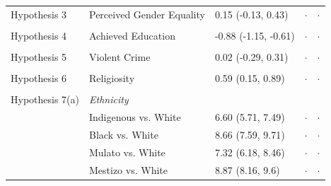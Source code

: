 \documentclass[12pt]{article}
\begin{document}
\begin{table}[h]
\begin{footnotesize}
\begin{tabular}{@{}lllll@{}}
Hypothesis 3        & Perceived Gender Equality                & 0.15 (-0.13, 0.43)    & $\cdot$                        & $\cdot$                             \\
                    &                                          &                              &                                &                                     \\
Hypothesis 4        & Achieved Education                       & -0.88 (-1.15, -0.61) & $\cdot$                        & $\cdot$                             \\
                    &                                          &                              &                                &                                     \\
Hypothesis 5        & Violent Crime                            & 0.02 (-0.29, 0.31)   & $\cdot$                        & $\cdot$                             \\
                    &                                          &                              &                                &                                     \\
Hypothesis 6        & Religiosity                             & 0.59 (0.15, 0.89)     & $\cdot$                        & $\cdot$                             \\
                    &                                          &                              &                                &                                     \\
Hypothesis 7(a)     & \textit{Ethnicity}                                &                              &                                &                                     \\
                    & Indigenous vs. White                     & 6.60 (5.71, 7.49)     & $\cdot$                        & $\cdot$                             \\
                    & Black vs. White                          & 8.66 (7.59, 9.71)     & $\cdot$                        & $\cdot$                             \\
                    & Mulato vs. White                         & 7.32 (6.18, 8.46)     & $\cdot$                        & $\cdot$                             \\
                    & Mestizo vs. White                        & 8.87 (8.16, 9.6)      & $\cdot$                        & $\cdot$                             \\

\end{tabular}
\end{footnotesize}
\end{table}
\end{document}
